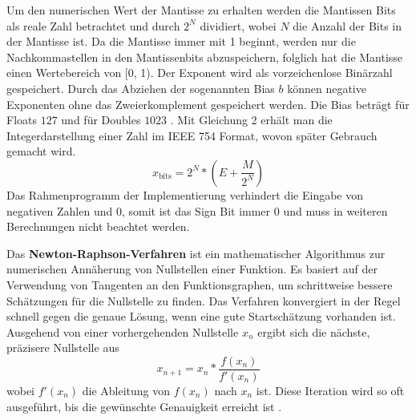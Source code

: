 \documentclass[course=erap]{aspdoc}
\begin{document}
Um den numerischen Wert der Mantisse zu erhalten werden die Mantissen Bits als reale Zahl betrachtet und durch \(2^N\) dividiert, wobei \(N\) die Anzahl der Bits in der Mantisse ist. Da die Mantisse immer mit 1 beginnt, werden nur die Nachkommastellen in den Mantissenbits abzuspeichern, folglich hat die Mantisse einen Wertebereich von [0, 1). Der Exponent wird als vorzeichenlose Binärzahl gespeichert. Durch das Abziehen der sogenannten Bias \(b\) können negative Exponenten ohne das Zweierkomplement gespeichert werden. Die Bias beträgt für Floats \(127\) und für Doubles \(1023\) \cite{ieee754}. Mit Gleichung 2 erhält man die Integerdarstellung einer Zahl im IEEE 754 Format, wovon später Gebrauch gemacht wird.
\begin{equation}
    x_{\text{bits}} = 2^N * \left(E + \frac{M}{2^N}\right)
\end{equation}
Das Rahmenprogramm der Implementierung verhindert die Eingabe von negativen Zahlen und 0, somit ist das Sign Bit immer 0 und muss in weiteren Berechnungen nicht beachtet werden. \par
Das \textbf{Newton-Raphson-Verfahren} ist ein mathematischer Algorithmus zur numerischen Annäherung von Nullstellen einer Funktion. Es basiert auf der Verwendung von Tangenten an den Funktionsgraphen, um schrittweise bessere Schätzungen für die Nullstelle zu finden. Das Verfahren konvergiert in der Regel schnell gegen die genaue Lösung, wenn eine gute Startschätzung vorhanden ist. Ausgehend von einer vorhergehenden Nullstelle \(x_n\) ergibt sich die nächste, präzisere Nullstelle aus
\begin{equation}
    x_{n+1} = x_n * \frac{f(x_n)}{f'(x_n)} 
\end{equation}
wobei $f'(x_n)$ die Ableitung von $f(x_n)$ nach $x_n$ ist. Diese Iteration wird so oft ausgeführt, bis die gewünschte Genauigkeit erreicht ist \cite{newton}.
\end{document}
